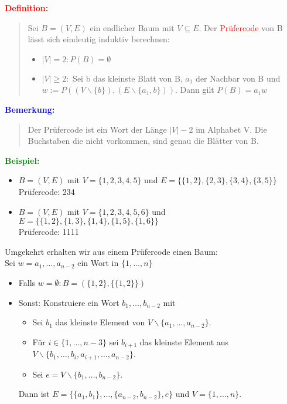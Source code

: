\documentclass{article}
\newcommand{\red}[1]{\textcolor{red}{#1}}
\newcommand{\blue}[1]{\textcolor{blue}{#1}}
\newcommand{\green}[1]{\textcolor{green}{#1}}
\newcommand{\ex}{\green{\textbf{Beispiel: }}}
\newcommand{\de}[1]{\red{\textbf{Definition: }}\begin{quote}#1\end{quote}}
\newcommand{\an}[1]{\blue{\textbf{Bemerkung: }}\begin{quote}#1\end{quote}}
\newcommand{\bs}{\backslash}
\begin{document}
\de{
    Sei $B = (V,E)$ ein endlicher Baum mit $V \subseteq E$. Der \red{Prüfercode} von B lässt sich eindeutig induktiv berechnen:
    \begin{itemize}
        \item $|V| = 2: P(B) = \emptyset$
        \item $|V| \ge 2:$ Sei b das kleinste Blatt von B, $a_1$ der Nachbar von B und $w := P((V \bs \{b\}), (E \bs \{a_1, b\}))$. Dann gilt $P(B) = a_1w$
    \end{itemize}
}

\an{
    Der Prüfercode ist ein Wort der Länge $|V| - 2$ im Alphabet V. Die Buchstaben die nicht vorkommen, sind genau die Blätter von B.
}

\ex
\begin{itemize}
    \item $B = (V,E)$ mit $V = \{1,2,3,4,5\}$ und $E = \{\{1,2\}, \{2,3\}, \{3,4\}, \{3,5\}\}$\\
    Prüfercode: 234
    \item $B = (V,E)$ mit $V = \{1,2,3,4,5,6\}$ und\\
    $E =  \{\{1,2\}, \{1,3\}, \{1,4\}, \{1,5\}, \{1,6\}\}$\\
    Prüfercode: 1111
\end{itemize}

Umgekehrt erhalten wir aus einem Prüfercode einen Baum:\\
Sei $w = a_1, \dots, a_{n-2}$ ein Wort in $\{1, \dots, n\}$
\begin{itemize}
    \item Falls $w =\emptyset: B = (\{1,2\}, \{\{1,2\}\})$
    \item Sonst: Konstruiere ein Wort $b_1, \dots, b_{n-2}$ mit
    \begin{itemize}
        \item Sei $b_1$ das kleinste Element von $V \bs \{a_1, \dots, a_{n-2}\}$.
        \item Für $i \in \{1, \dots, n-3\}$ sei $b_{i+1}$ das kleinste Element aus\\
        $V \bs \{b_1, \dots, b_i, a_{i+1}, \dots, a_{n-2}\}$.
        \item Sei $e = V \bs \{b_1, \dots, b_{n-2}\}$.
    \end{itemize}
    Dann ist $E = \{\{a_1, b_1\}, \dots, \{a_{n-2}, b_{n-2}\}, e\}$ und $V = \{1, \dots, n\}$.
\end{itemize}
\end{document}
